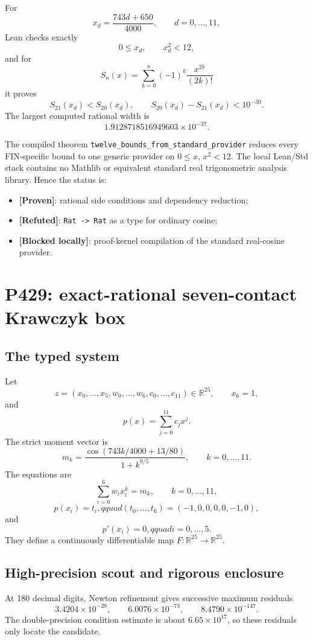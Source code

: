 \documentclass[11pt,a4paper]{article}
\newcommand{\status}[1]{\textbf{[#1]}}
\begin{document}
For
\[
x_d=\frac{743d+650}{4000},\qquad d=0,\ldots,11,
\]
Lean checks exactly
\[
0\le x_d,\qquad x_d^2<12,
\]
and for
\[
S_n(x)=\sum_{k=0}^{n}(-1)^k\frac{x^{2k}}{(2k)!}
\]
it proves
\[
S_{21}(x_d)<S_{20}(x_d),\qquad
S_{20}(x_d)-S_{21}(x_d)<10^{-30}.
\]
The largest computed rational width is
\[
1.9128718516949603\times10^{-37}.
\]

The compiled theorem \texttt{twelve\_bounds\_from\_standard\_provider}
reduces every FIN-specific bound to one generic provider on
$0\le x$, $x^2<12$. The local Lean/Std stack contains no Mathlib or equivalent
standard real trigonometric analysis library. Hence the status is:
\begin{itemize}
\item \status{Proven}: rational side conditions and dependency reduction;
\item \status{Refuted}: \texttt{Rat -> Rat} as a type for ordinary cosine;
\item \status{Blocked locally}: proof-kernel compilation of the standard
real-cosine provider.
\end{itemize}

\section{P429: exact-rational seven-contact Krawczyk box}

\subsection{The typed system}

Let
\[
z=(x_0,\ldots,x_5,w_0,\ldots,w_6,c_0,\ldots,c_{11})\in\mathbb R^{25},
\qquad x_6=1,
\]
and
\[
p(x)=\sum_{j=0}^{11}c_jx^j.
\]
The strict moment vector is
\[
m_k=\frac{\cos(743k/4000+13/80)}{1+k^{9/5}},
\qquad k=0,\ldots,11.
\]
The equations are
\[
\sum_{i=0}^{6}w_ix_i^k=m_k,
\qquad k=0,\ldots,11,
\]
\[
p(x_i)=t_i,qquad
(t_0,\ldots,t_6)=(-1,0,0,0,0,-1,0),
\]
and
\[
p'(x_i)=0,qquad i=0,\ldots,5.
\]
They define a continuously differentiable map $F:\mathbb R^{25}\to\mathbb R^{25}$.

\subsection{High-precision scout and rigorous enclosure}

At 180 decimal digits, Newton refinement gives successive maximum residuals
\[
3.4204\times10^{-28},\qquad
6.0076\times10^{-73},\qquad
8.4790\times10^{-147}.
\]
The double-precision condition estimate is about $6.65\times10^{17}$, so
these residuals only locate the candidate.
\end{document}
